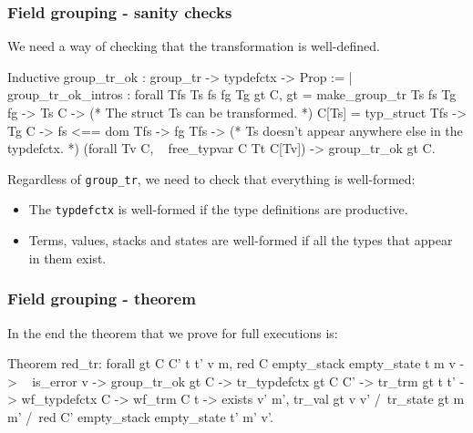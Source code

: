 \begin{frame}[fragile]
\frametitle{Field grouping - sanity checks}

We need a way of checking that the transformation is well-defined.

\begin{coqs}
  Inductive group_tr_ok : group_tr -> typdefctx -> Prop :=
    | group_tr_ok_intros : forall Tfs Ts fs fg Tg gt C,
        gt = make_group_tr Ts fs Tg fg ->
        Ts \indom C ->
        (* The struct Ts can be transformed. *)
        C[Ts] = typ_struct Tfs ->
        Tg \notindom C ->
        fs <== dom Tfs ->
        fg \notindom Tfs ->
        (* Ts doesn't appear anywhere else in the typdefctx. *)
        (forall Tv \indom C, ~ free_typvar C Tt C[Tv]) ->
        group_tr_ok gt C.
\end{coqs}

\bigskip \pause

Regardless of \texttt{group\_tr}, we need to check that everything is well-formed:
\begin{itemize}
	\item The \texttt{typdefctx} is well-formed if the type definitions are productive. \pause
	\item Terms, values, stacks and states are well-formed if all the types that appear in them exist.
\end{itemize}

\end{frame}


\begin{frame}[fragile]
\frametitle{Field grouping - theorem}

In the end the theorem that we prove for full executions is:

\begin{coq}
  Theorem red_tr: forall gt C C' t t' v m,
    red C empty_stack empty_state t m v ->
    ~ is_error v ->
    group_tr_ok gt C ->
    tr_typdefctx gt C C' ->
    tr_trm gt t t' ->
    wf_typdefctx C ->
    wf_trm C t ->
    exists v' m',		tr_val gt v v'
	  	   /\ tr_state gt m m'
		   /\ red C' empty_stack empty_state t' m' v'.
\end{coq}

\end{frame}


